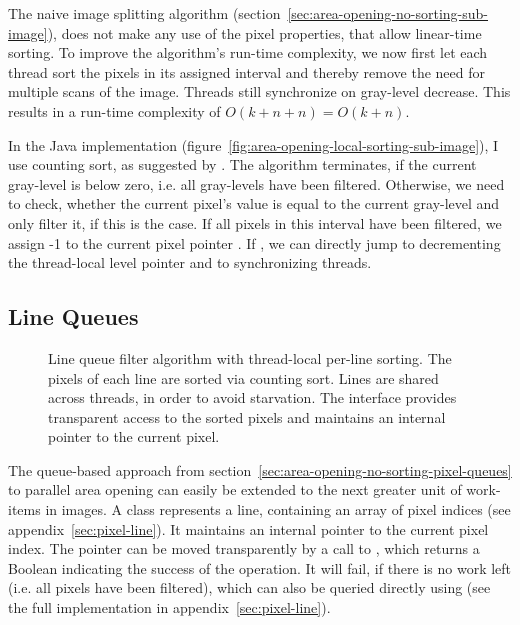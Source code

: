 The naive image splitting algorithm
(section~\ref{sec:area-opening-no-sorting-sub-image}), does not make any use of
the pixel properties, that allow linear-time sorting. To improve the algorithm's
run-time complexity, we now first let each thread sort the pixels in its
assigned interval and thereby remove the need for multiple scans of the
image. Threads still synchronize on gray-level decrease. This results in a
run-time complexity of $O(k + n + n) = O(k + n)$.

In the Java implementation
(figure~\ref{fig:area-opening-local-sorting-sub-image}), I use counting sort, as
suggested by \citet{Meijster2002Comparison}. The algorithm terminates, if the
current gray-level is below zero, i.e. all gray-levels have been
filtered. Otherwise, we need to check, whether the current pixel's value is
equal to the current gray-level and only filter it, if this is the case. If all
pixels in this interval have been filtered, we assign -1 to the current pixel
pointer . If , we can directly jump to
decrementing the thread-local level pointer and to synchronizing threads.

\subsection{Line Queues}
\label{sec:area-opening-local-sorting-queues}

\begin{figure}
  \centering

  

  \caption[Line queue filter algorithm with thread-local per-line sorting.]{Line
    queue filter algorithm with thread-local per-line sorting. The pixels of
    each line are sorted via counting sort. Lines are shared across threads, in
    order to avoid starvation. The  interface provides
    transparent access to the sorted pixels and maintains an internal pointer to
    the current pixel.}
  \label{fig:area-opening-local-sorting-queues}
\end{figure}

The queue-based approach from
section~\ref{sec:area-opening-no-sorting-pixel-queues} to parallel area opening
can easily be extended to the next greater unit of work-items in images. A class
 represents a line, containing an array of pixel indices (see
appendix~\ref{sec:pixel-line}). It maintains an internal pointer to the current
pixel index. The pointer can be moved transparently by a call to
, which returns a Boolean indicating the success of the
operation. It will fail, if there is no work left (i.e. all pixels have been
filtered), which can also be queried directly using  (see
the full implementation in appendix~\ref{sec:pixel-line}).

